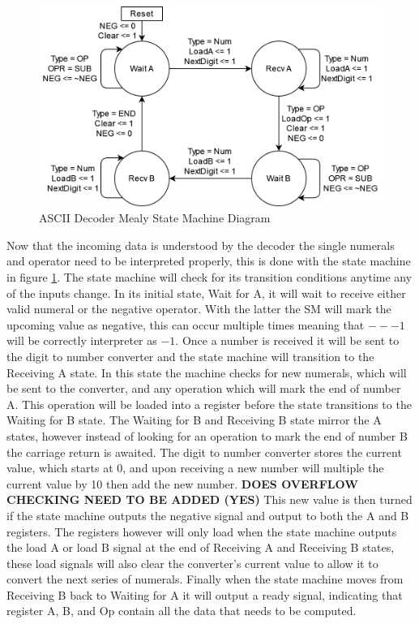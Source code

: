 \documentclass[11pt]{article}
\begin{document}
\begin{figure}[H]        
    \centering
    \includegraphics[width=.66\textwidth]{DecoderSM.drawio.png}
    \caption{ASCII Decoder Mealy State Machine Diagram}
    \label{fig:decodersm}
\end{figure} 

Now that the incoming data is understood by the decoder the single numerals and operator need to be interpreted properly, this is done with the state machine in figure \ref{fig:decodersm}.
The state machine will check for its transition conditions anytime any of the inputs change. 
In its initial state, Wait for A, it will wait to receive either valid numeral or the negative operator. 
With the latter the SM will mark the upcoming value as negative, this can occur multiple times meaning that $---1$ will be correctly interpreter as $-1$.
Once a number is received it will be sent to the digit to number converter and the state machine will transition to the Receiving A state. 
In this state the machine checks for new numerals, which will be sent to the converter, and any operation which will mark the end of number A.
This operation will be loaded into a register before the state transitions to the Waiting for B state.
The Waiting for B and Receiving B state mirror the A states, however instead of looking for an operation to mark the end of number B the carriage return is awaited.
The digit to number converter stores the current value, which starts at 0, and upon receiving a new number will multiple the current value by 10 then add the new number. 
\textbf{DOES OVERFLOW CHECKING NEED TO BE ADDED (YES)} 
This new value is then turned if the state machine outputs the negative signal and output to both the A and B registers.
The registers however will only load when the state machine outputs the load A or load B signal at the end of Receiving A and Receiving B states,
these load signals will also clear the converter's current value to allow it to convert the next series of numerals.
Finally when the state machine moves from Receiving B back to Waiting for A it will output a ready signal, indicating that register A, B, and Op contain all the data that needs to be computed.
\end{document}
